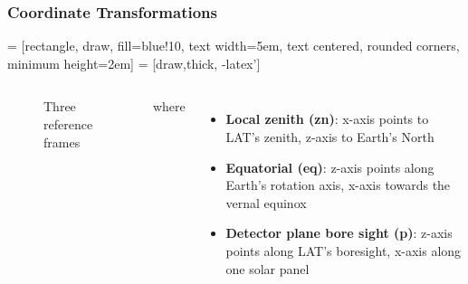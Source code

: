 \documentclass{beamer}
\begin{document}
\begin{frame}\frametitle{Coordinate Transformations}
 = [rectangle, draw, fill=blue!10, 
text width=5em, text centered, rounded corners, minimum height=2em]
 = [draw,thick, -latex']

\begin{columns}
    \begin{figure}[!h]
      \centering
      \caption{Three reference frames}
    \end{figure}

    where 
    \begin{itemize}
    \item \textbf{Local zenith (zn)}: x-axis points to LAT's zenith,
    z-axis to Earth's North
    \item \textbf{Equatorial (eq)}: z-axis points along Earth's rotation axis,
    x-axis towards the vernal equinox
    \item \textbf{Detector plane bore sight (p)}: z-axis points along LAT's boresight,
    x-axis along one solar panel
    \end{itemize}
\end{columns}
\end{frame}
\end{document}
